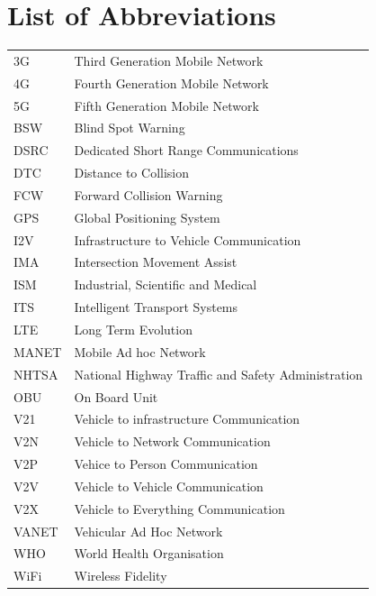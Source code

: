\documentclass[12pt]{report}
\begin{document}
\newpage

\tableofcontents

\newpage

\listoffigures

\newpage

\listoftables

\newpage



\section*{List of Abbreviations}

\begin{tabular}{p{3cm} l}
	3G &Third Generation Mobile Network\\
	4G &Fourth Generation Mobile Network\\
	5G &Fifth Generation Mobile Network\\
	BSW &Blind Spot Warning\\
	DSRC &Dedicated Short Range Communications\\
	DTC &Distance to Collision\\
	FCW &Forward Collision Warning\\
	GPS &Global Positioning System\\
	I2V & Infrastructure to Vehicle Communication\\
	IMA &Intersection Movement Assist\\
	ISM &Industrial, Scientific and Medical\\
	ITS &Intelligent Transport Systems\\
	LTE &Long Term Evolution\\
	MANET &Mobile Ad hoc Network\\
	NHTSA &National Highway Traffic and Safety Administration\\
	OBU &On Board Unit\\	
	V21 & Vehicle to infrastructure Communication\\
	V2N & Vehicle to Network Communication\\
	V2P & Vehice to Person Communication\\
	V2V	& Vehicle to Vehicle Communication\\
	V2X & Vehicle to Everything Communication\\
	VANET &Vehicular Ad Hoc Network\\
	WHO &World Health Organisation\\
	WiFi &Wireless Fidelity\\
	
	

\end{tabular}
\end{document}
